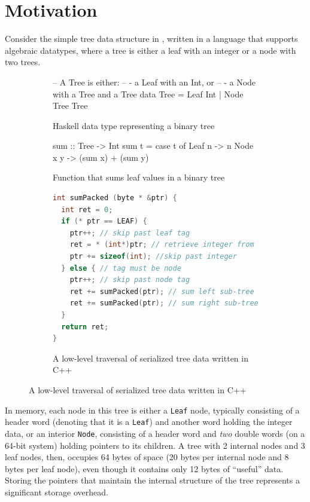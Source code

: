 \documentclass[showabstract,showacknowledgments,showpreface,showdedication]{iuphd}
\theoremstyle{nonumberplain}
\newcommand{\il}[1]{\lstinline[style=inline,mathescape=true];#1;}
\begin{document}
\section{Motivation}\label{sec:intro-motivation}

Consider the simple tree data structure in , written in
a language that supports algebraic datatypes, where a tree is either a leaf with
an integer or a node with two trees.

\begin{figure}
\begin{subfigure}{\textwidth}
\begin{code}
-- A Tree is either:
--  - a Leaf with an Int, or
--  - a Node with a Tree and a Tree
data Tree = Leaf Int | Node Tree Tree
\end{code}
\caption{Haskell data type representing a binary tree}
\label{fig:haskell_tree}
\end{subfigure}
\begin{subfigure}{\textwidth}
\begin{code}
sum :: Tree -> Int
sum t = case t of
          Leaf n   -> n
          Node x y -> (sum x) + (sum y)
\end{code}
\caption{Function that sums leaf values in a binary tree}
\label{fig:haskell_sumtree}
\end{subfigure}
\begin{subfigure}{\textwidth}
\begin{lstlisting}[language=C++]
int sumPacked (byte * &ptr) {
  int ret = 0;
  if (* ptr == LEAF) {
    ptr++; // skip past leaf tag
    ret = * (int*)ptr; // retrieve integer from leaf
    ptr += sizeof(int); //skip past integer
  } else { // tag must be node
    ptr++; // skip past node tag
    ret += sumPacked(ptr); // sum left sub-tree
    ret += sumPacked(ptr); // sum right sub-tree
  }
  return ret;
}
\end{lstlisting}
\caption{A low-level traversal of serialized tree data written in C++}
\label{fig:cpp-example}
\end{subfigure}

\end{figure}

In memory, each node in this tree is either a \il{Leaf} node, typically
consisting of a header word (denoting that it is a \il{Leaf}) and another word
holding the integer data, or an interior \il{Node}, consisting of a header word
and {\em two} double words (on a 64-bit system) holding pointers to its
children. A tree with 2 internal nodes and 3 leaf nodes, then, occupies 64 bytes
of space (20 bytes per internal node and 8 bytes per leaf node), even though it
contains only 12 bytes of ``useful'' data.  Storing the pointers that maintain
the internal structure of the tree represents a significant storage overhead.
\end{document}

